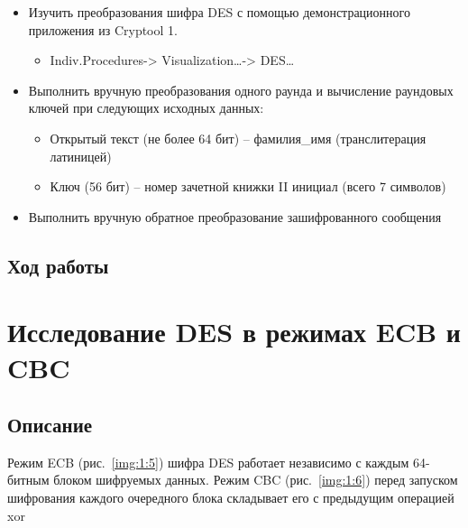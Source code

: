 \documentclass[a4paper, 14pt]{extarticle}
\begin{document}
\begin{itemize}
    \item Изучить преобразования шифра DES с помощью демонстрационного приложения из Cryptool 1.
        \begin{itemize}
            \item Indiv.Procedures-> Visualization…-> DES…
        \end{itemize}
    \item Выполнить вручную преобразования одного раунда и вычисление раундовых ключей при следующих исходных данных:
        \begin{itemize}
            \item Открытый текст (не более 64 бит) – фамилия\_имя (транслитерация латиницей)
            \item Ключ (56 бит) – номер зачетной книжки II инициал (всего 7 символов)
        \end{itemize}
    \item Выполнить вручную обратное преобразование зашифрованного сообщения
\end{itemize}

\subsection{Ход работы}
\lipsum[1] %

\section{Исследование DES в режимах ECB и CBC}
\subsection{Описание}
Режим ECB (рис.~\ref{img:1:5}) шифра DES работает независимо с каждым 64-битным блоком шифруемых данных. Режим CBC (рис.~\ref{img:1:6}) перед запуском шифрования каждого очередного блока складывает его с предыдущим операцией xor
\end{document}
